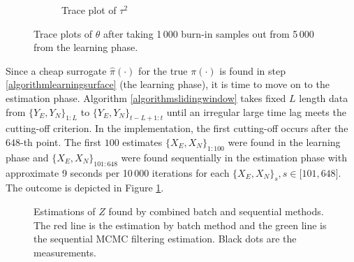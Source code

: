 \begin{figure}[h]
\begin{subfigure}[t]{0.45\textwidth}
	\caption{Trace plot of $\tau^2$}
\end{subfigure}
\caption{Trace plots of $\theta$ after taking 1\,000 burn-in samples out from 5\,000 from the learning phase.}
\end{figure}



\clearpage

Since a cheap surrogate $\hat{\pi}(\cdot)$ for the true $\pi(\cdot)$ is found in step \ref{algorithmlearningsurface} (the learning phase), it is time to move on to the estimation phase. Algorithm \ref{algorithmslidingwindow} takes fixed $L$ length data from $\{Y_E,Y_N\}_{1:L}$ to $\{Y_E,Y_N\}_{t-L+1:t}$ until an irregular large time lag meets the cutting-off criterion. In the implementation, the first cutting-off occurs after the $648$-th point. The first $100$ estimates $\{X_E,X_N\}_{1:100}$ were found in the learning phase and $\{X_E,X_N\}_{101:648}$ were found sequentially in the estimation phase with approximate 9 seconds per 10\,000 iterations for each $\{X_E,X_N\}_s, s\in \lbrack 101,648\rbrack$. The outcome is depicted in Figure \ref{MCMCfirstportionestimation}. 


\begin{figure}[h]
\centering
\caption{Estimations of $Z$ found by combined batch and sequential methods. The red line is the estimation by batch method and the green line is the sequential MCMC filtering estimation. Black dots are the measurements.}\label{MCMCfirstportionestimation}
\end{figure}



